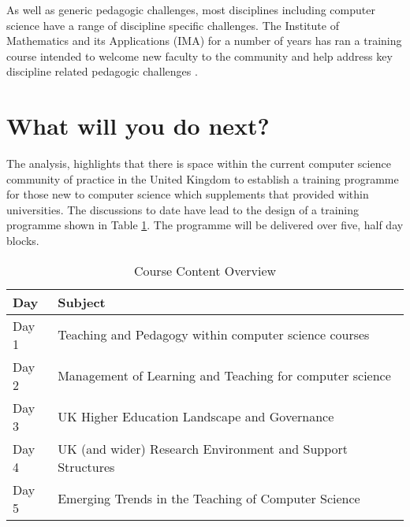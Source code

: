 \documentclass[sigconf]{acmart}
\begin{document}
As well as generic pedagogic challenges, most disciplines including computer science have a range of discipline specific challenges. The Institute of Mathematics and its Applications (IMA) for a number of years has ran a training course intended to welcome new faculty to the community and help address key discipline related pedagogic challenges \cite{IMA}.

\section{What will you do next?}

The analysis, highlights that there is space within the current computer science community of practice in the United Kingdom to establish a training programme for those new to computer science which supplements that provided within universities. The discussions to date have lead to the design of a training programme shown in Table \ref{tab:table1}. The programme will be delivered over five, half day blocks. 

\begin{table}[h]
\begin{tabular}{|p{0.5in}|p{2.5in}|}
\hline
Day   & Subject                                                      \\ \hline
Day 1 & Teaching and Pedagogy within computer science courses        \\ \hline
Day 2 & Management of Learning and Teaching for computer   science   \\ \hline
Day 3 & UK Higher Education Landscape and Governance                 \\ \hline
Day 4 & UK (and wider) Research Environment and Support   Structures \\ \hline
Day 5 & Emerging Trends in the Teaching of Computer Science          \\ \hline
\end{tabular}
\caption{Course Content Overview}
\label{tab:table1}
\end{table}

\end{document}

